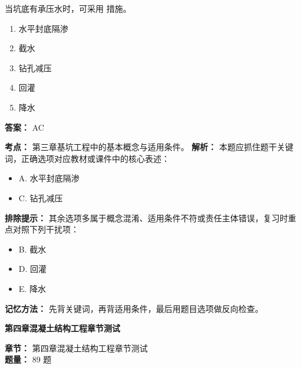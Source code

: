 \documentclass[UTF8,fontset=fandol,11pt]{ctexart}
\newcommand{\chaptertitle}[1]{\vspace{0.5em}\begin{tcolorbox}[enhanced,colback=deepblue,colframe=deepblue,arc=2mm,boxrule=0pt]\begin{center}\Large\bfseries\color{white}#1\end{center}\end{tcolorbox}\vspace{0.5em}}
\begin{document}
\begin{quizbox}[title={第 23 题}]
当坑底有承压水时，可采用 措施。\\
\begin{enumerate}[label=\Alph*.]
\item 水平封底隔渗
\item 截水
\item 钻孔减压
\item 回灌
\item 降水
\end{enumerate}
\textbf{答案：} AC
\vspace{0.25em}
\begin{answerbox}[title={考点解析}]
\textbf{考点：} 第三章基坑工程中的基本概念与适用条件。
\textbf{解析：} 本题应抓住题干关键词，正确选项对应教材或课件中的核心表述：
\begin{itemize}
\item A. 水平封底隔渗
\item C. 钻孔减压
\end{itemize}
\textbf{排除提示：} 其余选项多属于概念混淆、适用条件不符或责任主体错误，复习时重点对照下列干扰项：
\begin{itemize}
\item B. 截水
\item D. 回灌
\item E. 降水
\end{itemize}
\textbf{记忆方法：} 先背关键词，再背适用条件，最后用题目选项做反向检查。
\end{answerbox}
\end{quizbox}

\vspace{0.2em}

\chaptertitle{第四章混凝土结构工程章节测试}
\begin{mainbox}
\textbf{\textcolor{mainblue}{章节：}} 第四章混凝土结构工程章节测试\\
\textbf{\textcolor{answerred}{题量：}} 89 题
\end{mainbox}
\end{document}

